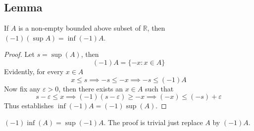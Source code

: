 \documentclass[../../main.tex]{subfiles}
\begin{document}
\subsection{Lemma}
\begin{lemma}\label{lemma:swap_sup_inf}
    If $A$ is a non-empty bounded above subset of $\mathbb{R}$, then $(-1)(\sup A) = \inf (-1)A$.
\end{lemma}
\begin{proof}
    Let $s=\sup(A)$, then
    \[
    (-1)A = \{-x: x\in A\}
    \]
    Evidently, for every $x\in A$
    \[
    x\leq s\implies -s\leq -x\implies -s\leq (-1)A
    \]
    Now fix any $\varepsilon>0$, then there exists an $x\in A$ such that
    \[
    s-\varepsilon\leq x\implies (-1)(s-\varepsilon)\geq -x\implies (-x)\leq (-s)+\varepsilon
    \]
    Thus establishes $\inf(-1)A=(-1)\sup(A)$.
\end{proof}
\begin{corollary}
    $(-1)\inf(A) = \sup(-1)A$. The proof is trivial just replace $A$ by $(-1)A$.
\end{corollary}
\end{document}
